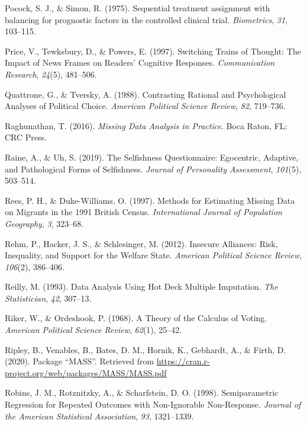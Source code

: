 \documentclass[12pt,econ]{sources/authesis}
\begin{document}
\leavevmode\hypertarget{ref-pocock_1975_sequential}{}%
Pocock, S. J., \& Simon, R. (1975). Sequential treatment assignment with balancing for prognostic factors in the controlled clinical trial. \emph{Biometrics}, \emph{31}, 103--115.

\leavevmode\hypertarget{ref-price_switching_1997}{}%
Price, V., Tewksbury, D., \& Powers, E. (1997). Switching Trains of Thought: The Impact of News Frames on Readers' Cognitive Responses. \emph{Communication Research}, \emph{24}(5), 481--506.

\leavevmode\hypertarget{ref-quattrone_1988_contrasting}{}%
Quattrone, G., \& Tversky, A. (1988). Contrasting Rational and Psychological Analyses of Political Choice. \emph{American Political Science Review}, \emph{82}, 719--736.

\leavevmode\hypertarget{ref-raghunathan_2016_missing}{}%
Raghunathan, T. (2016). \emph{Missing Data Analysis in Practice}. Boca Raton, FL: CRC Press.

\leavevmode\hypertarget{ref-raine_2019_selfishness}{}%
Raine, A., \& Uh, S. (2019). The Selfishness Questionnaire: Egocentric, Adaptive, and Pathological Forms of Selfishness. \emph{Journal of Personality Assessment}, \emph{101}(5), 503--514.

\leavevmode\hypertarget{ref-rees_1997_methods}{}%
Rees, P. H., \& Duke-Williams, O. (1997). Methods for Estimating Missing Data on Migrants in the 1991 British Census. \emph{International Journal of Population Geography}, \emph{3}, 323--68.

\leavevmode\hypertarget{ref-rehm_2012_insecure}{}%
Rehm, P., Hacker, J. S., \& Schlesinger, M. (2012). Insecure Alliances: Risk, Inequality, and Support for the Welfare State. \emph{American Political Science Review}, \emph{106}(2), 386--406.

\leavevmode\hypertarget{ref-reilly_1993_data}{}%
Reilly, M. (1993). Data Analysis Using Hot Deck Multiple Imputation. \emph{The Statistician}, \emph{42}, 307--13.

\leavevmode\hypertarget{ref-riker_theory_1968}{}%
Riker, W., \& Ordeshook, P. (1968). A Theory of the Calculus of Voting. \emph{American Political Science Review}, \emph{62}(1), 25--42.

\leavevmode\hypertarget{ref-ripley_2020_package}{}%
Ripley, B., Venables, B., Bates, D. M., Hornik, K., Gebhardt, A., \& Firth, D. (2020). Package ``MASS''. Retrieved from \url{https://cran.r-project.org/web/packages/MASS/MASS.pdf}

\leavevmode\hypertarget{ref-robins_1998_semiparametric}{}%
Robins, J. M., Rotznitzky, A., \& Scharfstein, D. O. (1998). Semiparametric Regression for Repeated Outcomes with Non-Ignorable Non-Response. \emph{Journal of the American Statistical Association}, \emph{93}, 1321--1339.
\end{document}
